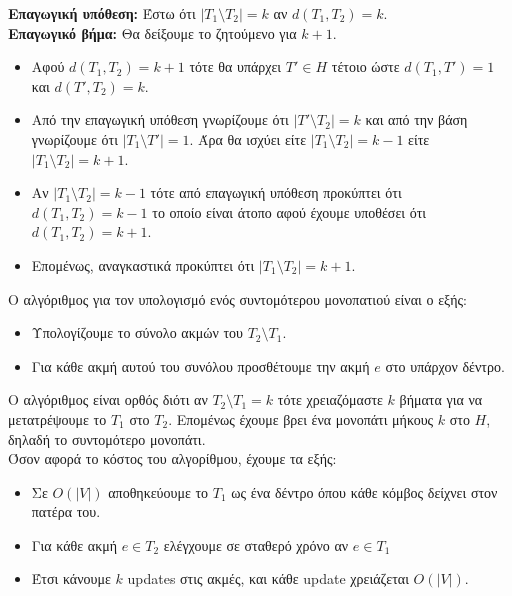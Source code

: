 			\textbf{Επαγωγική υπόθεση:} Έστω ότι $|T_1 \setminus T_2| = k$ αν $d(T_1, T_2) = k$. \\
			
			\textbf{Επαγωγικό βήμα:} Θα δείξουμε το ζητούμενο για $k + 1$. 
			
			\begin{itemize}
				\item Αφού $d(T_1, T_2) = k + 1$ τότε θα υπάρχει $T' \in H$ τέτοιο ώστε $d(T_1, T') = 1$ και $d(T', T_2) = k$.
				\item Από την επαγωγική υπόθεση γνωρίζουμε ότι $|T' \setminus T_2| = k$ και από την βάση γνωρίζουμε ότι $|Τ_1 \setminus T'| = 1$. Άρα θα ισχύει είτε $|T_1 \setminus T_2| = k - 1$ είτε $|T_1 \setminus T_2| = k + 1$.
				\item Αν $|Τ_1 \setminus T_2| = k - 1$ τότε από επαγωγική υπόθεση προκύπτει ότι $d(T_1, T_2) = k - 1$ το οποίο είναι άτοπο αφού έχουμε υποθέσει ότι $d(T_1, T_2) = k + 1$.
				\item Επομένως, αναγκαστικά προκύπτει ότι $|T_1 \setminus T_2| = k + 1$.	
			\end{itemize}
		
		Ο αλγόριθμος για τον υπολογισμό ενός συντομότερου μονοπατιού είναι ο εξής:
		
		\begin{itemize}
			\item Υπολογίζουμε το σύνολο ακμών του $T_2 \setminus T_1$.
			\item Για κάθε ακμή αυτού του συνόλου προσθέτουμε την ακμή $e$ στο υπάρχον δέντρο.
		\end{itemize}    
			
		Ο αλγόριθμος είναι ορθός διότι αν $T_2 \setminus T_1 = k$ τότε χρειαζόμαστε $k$ βήματα για να μετατρέψουμε το $T_1$ στο $T_2$. Επομένως έχουμε βρει ένα μονοπάτι μήκους $k$ στο $H$, δηλαδή το συντομότερο μονοπάτι. \\
		
		Όσον αφορά το κόστος του αλγορίθμου, έχουμε τα εξής: 
		
		\begin{itemize}
			\item Σε $O(|V|)$ αποθηκεύουμε το $T_1$ ως ένα δέντρο όπου κάθε κόμβος δείχνει στον πατέρα του. 
			\item Για κάθε ακμή $e \in T_2$ ελέγχουμε σε σταθερό χρόνο αν $e \in T_1$
			\item Έτσι κάνουμε $k$ updates στις ακμές, και κάθε update χρειάζεται $O(|V|)$. 
		\end{itemize}
	
